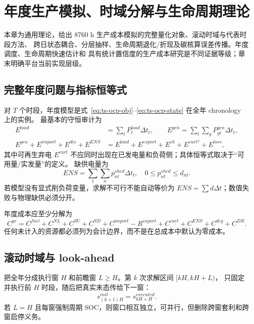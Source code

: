 
\section{年度生产模拟、时域分解与生命周期理论}\label{sec:ts-th-life}

\begin{theorynote}
本章为通用理论，给出 8760 h 生产成本模拟的完整量化对象、滚动时域与代表时段方法、
跨日状态耦合、分层抽样、生命周期退化/折现及碳核算误差传播。年度调度、生命周期快速估计和
具有统计置信度的生产成本研究是不同证据等级；章末明确平台当前实现层级。
\end{theorynote}

\subsection{完整年度问题与指标恒等式}
对 $T$ 个时段，年度模型是式~\eqref{eq:ts-ocp-obj}--\eqref{eq:ts-ocp-state} 在全年 chronology 上的实例。
最基本的守恒审计为
\begin{align}
E^{load}&=\sum_tP_t^{load}\Delta t_t,\qquad
E^{gen}=\sum_t\sum_gP_{gt}^{gen}\Delta t_t,\label{eq:ts-energy}\\
E^{gen}+E^{import}+E^{dis}+E^{ENS}
&=E^{load}+E^{export}+E^{ch}+E^{curt?}+E^{loss},\label{eq:ts-annual-balance}
\end{align}
其中可再生弃电 $E^{curt}$ 不应同时出现在已发电量和负荷侧；具体恒等式取决于“可用量/实发量”的定义。
缺供电量为
\begin{equation}
ENS=\sum_t\sum_n p_{nt}^{shed}\Delta t_t,\quad 0\le p_{nt}^{shed}\le d_{nt}.\label{eq:ts-ens}
\end{equation}
若模型没有显式削负荷变量，求解不可行不能自动等价为 $ENS=\sum d\Delta t$；数值失败与物理缺供必须分开。

年度成本应至少分解为
\begin{equation}
C^{yr}=C^{fuel}+C^{NL}+C^{SU}+C^{SD}+C^{import}-R^{export}
+C^{curt}+C^{ENS}+C^{deg}+C^{DR}.\label{eq:ts-annual-cost}
\end{equation}
任何未计入的资源都必须列为会计边界，而不是在总成本中默认为零成本。

\subsection{滚动时域与 look-ahead}
把全年分成执行窗 $H$ 和前瞻窗 $L\ge H$。第 $k$ 次求解区间 $[kH,kH+L)$，
只固定并执行前 $H$ 时段，随后把真实末态传给下一窗：
\begin{equation}
s_{(k+1)H}^{init}=s_{kH+H}^{executed}.\label{eq:ts-rolling}
\end{equation}
若 $L=H$ 且每窗强制周期 SOC，则窗口相互独立，可并行，但删除跨窗套利和跨窗启停义务。


